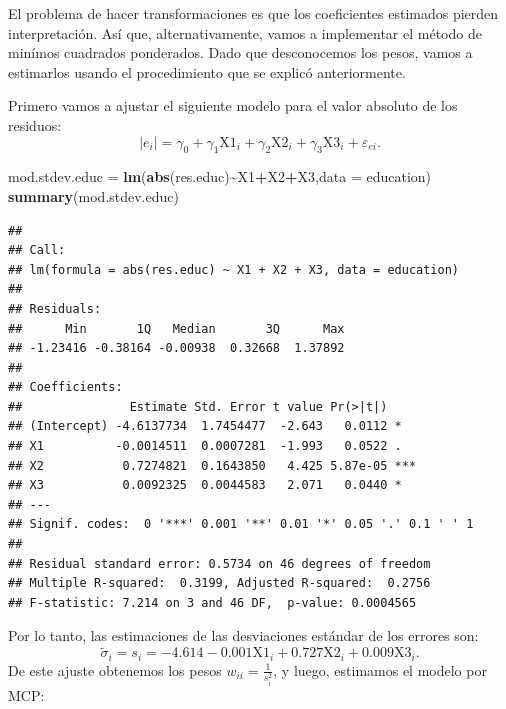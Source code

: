 \documentclass[
]{article}
\newenvironment{Shaded}{\begin{snugshade}}{\end{snugshade}}
\newcommand{\AttributeTok}[1]{\textcolor[rgb]{0.13,0.29,0.53}{#1}}
\newcommand{\DecValTok}[1]{\textcolor[rgb]{0.00,0.00,0.81}{#1}}
\newcommand{\FunctionTok}[1]{\textcolor[rgb]{0.13,0.29,0.53}{\textbf{#1}}}
\newcommand{\NormalTok}[1]{#1}
\newcommand{\OtherTok}[1]{\textcolor[rgb]{0.56,0.35,0.01}{#1}}
\newcommand{\SpecialCharTok}[1]{\textcolor[rgb]{0.81,0.36,0.00}{\textbf{#1}}}
\begin{document}
El problema de hacer transformaciones es que los coeficientes estimados pierden interpretación. Así que, alternativamente, vamos a implementar el método de minímos cuadrados ponderados. Dado que desconocemos los pesos, vamos a estimarlos usando el procedimiento que se explicó anteriormente.

Primero vamos a ajustar el siguiente modelo para el valor absoluto de los residuos:
\[
|e_{i}| = \gamma_{0} + \gamma_{1}\mbox{X1}_{i}+ \gamma_{2}\mbox{X2}_{i} + \gamma_{3}\mbox{X3}_{i} + \varepsilon_{ei}.
\]

\begin{Shaded}
\begin{Highlighting}[]
\NormalTok{mod.stdev.educ }\OtherTok{=} \FunctionTok{lm}\NormalTok{(}\FunctionTok{abs}\NormalTok{(res.educ)}\SpecialCharTok{\textasciitilde{}}\NormalTok{X1}\SpecialCharTok{+}\NormalTok{X2}\SpecialCharTok{+}\NormalTok{X3,}\AttributeTok{data =}\NormalTok{ education)}
\FunctionTok{summary}\NormalTok{(mod.stdev.educ)}
\end{Highlighting}
\end{Shaded}

\begin{verbatim}
## 
## Call:
## lm(formula = abs(res.educ) ~ X1 + X2 + X3, data = education)
## 
## Residuals:
##      Min       1Q   Median       3Q      Max 
## -1.23416 -0.38164 -0.00938  0.32668  1.37892 
## 
## Coefficients:
##               Estimate Std. Error t value Pr(>|t|)    
## (Intercept) -4.6137734  1.7454477  -2.643   0.0112 *  
## X1          -0.0014511  0.0007281  -1.993   0.0522 .  
## X2           0.7274821  0.1643850   4.425 5.87e-05 ***
## X3           0.0092325  0.0044583   2.071   0.0440 *  
## ---
## Signif. codes:  0 '***' 0.001 '**' 0.01 '*' 0.05 '.' 0.1 ' ' 1
## 
## Residual standard error: 0.5734 on 46 degrees of freedom
## Multiple R-squared:  0.3199, Adjusted R-squared:  0.2756 
## F-statistic: 7.214 on 3 and 46 DF,  p-value: 0.0004565
\end{verbatim}

Por lo tanto, las estimaciones de las desviaciones estándar de los errores son:
\[
\widetilde{\sigma}_{i} = s_{i} = -4.614  -0.001\mbox{X1}_{i} + 0.727\mbox{X2}_{i} + 0.009\mbox{X3}_{i}.
\]
De este ajuste obtenemos los pesos \(w_{ii} = \frac{1}{s_{i}^{2}}\), y luego, estimamos el modelo por MCP:

\begin{Shaded}
\end{Shaded}
\end{document}
